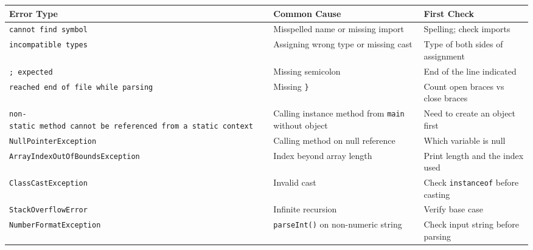 \documentclass[
  justified,
  openright,
]{tufte-book}
\begin{document}
\begin{fullwidth}{\def\LTcaptype{none} %
\begin{longtable}[]{@{}
  >{\raggedright\arraybackslash}p{}
  >{\raggedright\arraybackslash}p{}
  >{\raggedright\arraybackslash}p{}@{}}
\toprule\noalign{}
\begin{minipage}[b]{\linewidth}\raggedright
Error Type
\end{minipage} & \begin{minipage}[b]{\linewidth}\raggedright
Common Cause
\end{minipage} & \begin{minipage}[b]{\linewidth}\raggedright
First Check
\end{minipage} \\
\midrule\noalign{}
\endhead
\bottomrule\noalign{}
\endlastfoot
\texttt{cannot\ find\ symbol} & Misspelled name or missing import &
Spelling; check imports \\
\texttt{incompatible\ types} & Assigning wrong type or missing cast &
Type of both sides of assignment \\
\texttt{\textquotesingle{};\textquotesingle{}\ expected} & Missing
semicolon & End of the line indicated \\
\texttt{reached\ end\ of\ file\ while\ parsing} & Missing \texttt{\}} &
Count open braces vs close braces \\
\texttt{non-static\ method\ cannot\ be\ referenced\ from\ a\ static\ context}
& Calling instance method from \texttt{main} without object & Need to
create an object first \\
\texttt{NullPointerException} & Calling method on null reference & Which
variable is null \\
\texttt{ArrayIndexOutOfBoundsException} & Index beyond array length &
Print length and the index used \\
\texttt{ClassCastException} & Invalid cast & Check \texttt{instanceof}
before casting \\
\texttt{StackOverflowError} & Infinite recursion & Verify base case \\
\texttt{NumberFormatException} & \texttt{parseInt()} on non-numeric
string & Check input string before parsing \\
\end{longtable}
}
\end{fullwidth}
\end{document}
